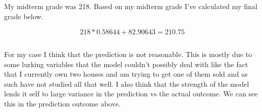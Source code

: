\documentclass[letterpaper, onecolumn,10pt]{IEEEtran}
\begin{document}
            \subsection{}
            My midterm grade was 218. Based on my midterm grade I've calculated my final grade below.
            
            \[
                218*0.58644 + 82.90643 = 210.75
            \]
            
            \subsection{}
            For my case I think that the prediction is not reasonable. This is mostly due to some lurking variables that the model couldn't possibly deal with like the fact that I currently own two houses and am trying to get one of them sold and as such have not studied all that well. I also think that the strength of the model lends it self to large variance in the prediction vs the actual outcome. We can see this in the prediction outcome above.\\
            
		
\end{document}
